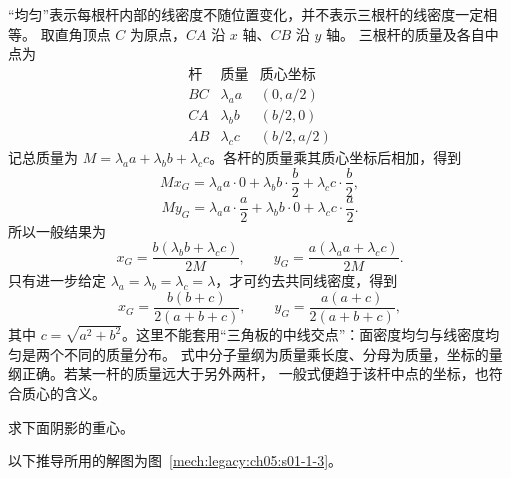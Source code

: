 {\begin{xesolution}
“均匀”表示每根杆内部的线密度不随位置变化，并不表示三根杆的线密度一定相等。
取直角顶点 $C$ 为原点，$CA$ 沿 $x$ 轴、$CB$ 沿 $y$ 轴。
三根杆的质量及各自中点为
\[
\begin{array}{c|c|c}
\text{杆} & \text{质量} & \text{质心坐标}\\ \hline
BC & \lambda_a a &(0,a/2)\\
CA & \lambda_b b &(b/2,0)\\
AB & \lambda_c c &(b/2,a/2)
\end{array}
\]
记总质量为 $M=\lambda_a a+\lambda_b b+\lambda_c c$。各杆的质量乘其质心坐标后相加，得到
\[
 Mx_G=\lambda_a a\cdot0+\lambda_b b\cdot\frac b2+\lambda_c c\cdot\frac b2,
\]
\[
 My_G=\lambda_a a\cdot\frac a2+\lambda_b b\cdot0+\lambda_c c\cdot\frac a2.
\]
所以一般结果为
\[
 \boxed{x_G=\frac{b(\lambda_b b+\lambda_c c)}{2M},\qquad
 y_G=\frac{a(\lambda_a a+\lambda_c c)}{2M}}.
\]
只有进一步给定 $\lambda_a=\lambda_b=\lambda_c=\lambda$，才可约去共同线密度，得到
\[
  \boxed{x_G=\frac{b(b+c)}{2(a+b+c)},\qquad
  y_G=\frac{a(a+c)}{2(a+b+c)}} ,
\]
其中 $c=\sqrt{a^2+b^2}$。这里不能套用“三角板的中线交点”：面密度均匀与线密度均匀是两个不同的质量分布。
式中分子量纲为质量乘长度、分母为质量，坐标的量纲正确。若某一杆的质量远大于另外两杆，
一般式便趋于该杆中点的坐标，也符合质心的含义。
\end{xesolution}

\begin{origexamplebox}{}\label{ch05:ex:s01-1-3}
求下面阴影的重心。

\begin{center}
\end{center}
\end{origexamplebox}

\begin{xesolution}
以下推导所用的解图为图~\ref{mech:legacy:ch05:s01-1-3}。


\end{xesolution}}
